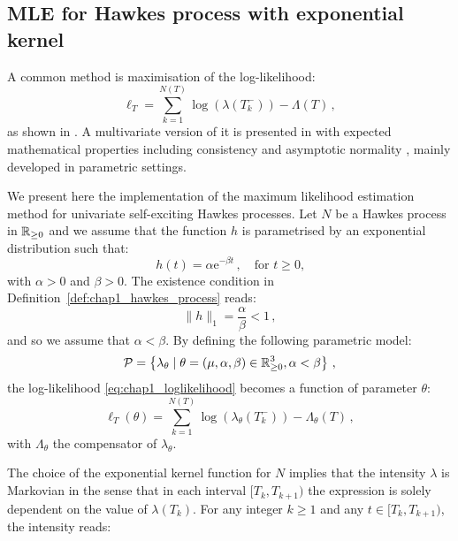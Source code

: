 \subsection{MLE for Hawkes process with exponential kernel}\label{sec:chap1_exponential_MLE}

A common method is maximisation of the log-likelihood:
\[\ell_T = \sum_{k=1}^{N(T)}{\log(\lambda(T_k^-))} - \Lambda(T)\,,\]
as shown in \textcite{Ozaki1979}. A multivariate version of it is presented in \textcite{Embrechts2011, Guo2018} with expected mathematical properties including consistency and asymptotic normality \parencite{Clinet2017}, mainly developed in parametric settings.

We present here the implementation of the maximum likelihood estimation method for univariate self-exciting Hawkes processes.
Let $N$ be a Hawkes process in ${\mathbb R}_{\geq 0}$ and we assume that the function $h$ is parametrised by an exponential distribution such that:
\[h(t) = \alpha\mathrm{e}^{-\beta t}\,, \quad \text{for $t\geq 0$,}\]
with $\alpha >0$ and $\beta>0$.
The existence condition in Definition~\ref{def:chap1_hawkes_process} reads:
\[\|h\|_1 = \frac{\alpha}{\beta} < 1\,,\]
and so we assume that $\alpha < \beta$. 
By defining the following parametric model:
\[\mathcal{P} = \left\{
    \lambda_\theta \mid \theta = (\mu, \alpha, \beta)\in{\mathbb R}_{\geq 0}^3, \alpha < \beta
\right\}\,,\]
the log-likelihood \eqref{eq:chap1_loglikelihood} becomes a function of parameter $\theta$:
\[
    \ell_T(\theta) = \sum_{k=1}^{N(T)}{\log(\lambda_\theta(T_k^-))} - \Lambda_\theta(T)\,,
\]
with $\Lambda_\theta$ the compensator of $\lambda_\theta$.

The choice of the exponential kernel function for $N$ implies that the intensity $\lambda$ is Markovian in the sense that in each interval $[T_k, T_{k+1})$ the expression is solely dependent on the value of $\lambda(T_k)$. For any integer $k\geq 1$ and any $t\in[T_k, T_{k+1})$, the intensity reads:

